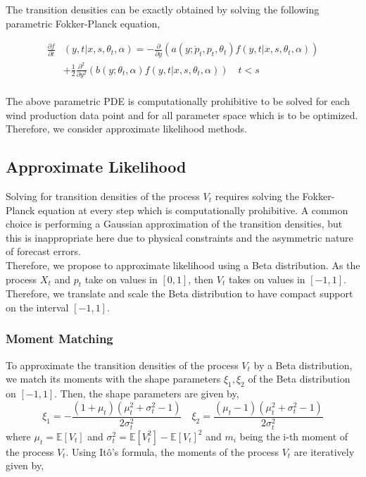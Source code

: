 \documentclass[10pt,twocolumn,letterpaper]{article}
\newcommand{\E}{\mathbb{E}}
\begin{document}
The transition densities can be exactly obtained by solving the following parametric Fokker-Planck equation,

\begin{equation}
\begin{split}
\frac{ \partial f }{\partial t } & (y ,t | x , s, \theta_t, \alpha )= - \frac{\partial}{ \partial y} ( a( y;\dot{p}_t , p_t, \theta_t ) f( y ,t | x , s, \theta_t , \alpha ) ) \\
& + \frac{1}{2} \frac{\partial^2}{ \partial y^2} ( b(y;\theta_t, \alpha  )  f( y ,t | x , s, \theta_t , \alpha )  ) \quad  t < s\\
\end{split}
\end{equation}

The above parametric PDE is computationally prohibitive to be solved for each wind production data point and for all parameter space which is to be optimized. Therefore, we consider approximate likelihood methods.

\subsection{Approximate Likelihood}
Solving for transition densities of the process $V_t$ requires solving the Fokker-Planck equation at every step which is computationally prohibitive. A common choice is performing a Gaussian approximation of the transition densities, but this is inappropriate here due to physical constraints and the asymmetric nature of forecast errors. \\

Therefore, we propose to approximate likelihood using a Beta distribution. As the process $X_t$ and $p_t$ take on values in $[0,1]$, then $V_t$ takes on values in $[-1,1]$. Therefore, we translate and scale the Beta distribution to have compact support on the interval $[-1,1]$.


\subsubsection*{ Moment Matching}
To approximate the transition densities of  the process $V_t$ by a Beta distribution, we match its moments with the shape parameters $\xi_1, \xi_2$ of the Beta distribution on $[-1,1]$.  Then, the shape parameters are given by,
\begin{equation}
\xi_1 = - \frac{(1+\mu_t )(\mu_t^2 + \sigma_t^2 -1)}{2 \sigma_t^2} \quad \xi_2=  \frac{(\mu_t-1 )(\mu_t^2 + \sigma_t^2 -1)}{2 \sigma_t^2} \label{param_transformed_beta}
\end{equation}
where $\mu_t = \E[ V_t]$ and $\sigma_t^2= \E[ V^2_t]- \E[ V_t]^2$ and $m_i$ being the i-th moment of the process $V_t$. Using It\^{o}'s formula, the moments  of the  process $V_t$ are iteratively given by,
\end{document}
